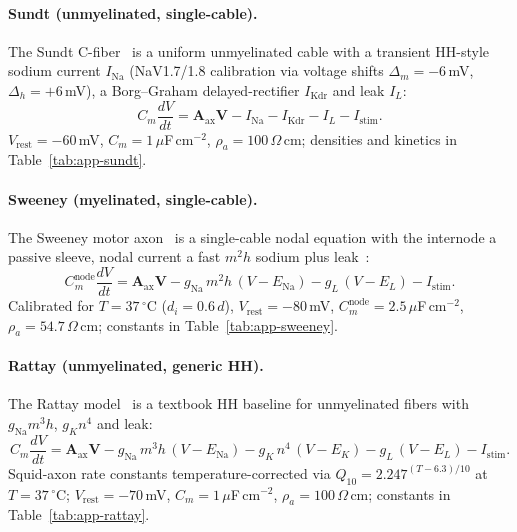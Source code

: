 \paragraph{Sundt (unmyelinated, single-cable).}
The Sundt C-fiber~\cite{sundt2015} is a uniform unmyelinated cable with
a transient HH-style sodium current $I_{\mathrm{Na}}$ (NaV1.7/1.8
calibration via voltage shifts $\Delta_m = -6$\,mV, $\Delta_h = +6$\,mV),
a Borg--Graham delayed-rectifier $I_{\mathrm{Kdr}}$ and leak $I_L$:
\begin{equation}
  C_m \frac{dV}{dt} = \mathbf{A}_{\mathrm{ax}}\mathbf{V} - I_{\mathrm{Na}}
  - I_{\mathrm{Kdr}} - I_L - I_{\mathrm{stim}}.
  \label{eq:cable-sundt}
\end{equation}
$V_{\mathrm{rest}} = -60$\,mV, $C_m = 1\,\mu$F\,cm$^{-2}$,
$\rho_a = 100\,\Omega\,$cm; densities and kinetics in
Table~\ref{tab:app-sundt}.

\paragraph{Sweeney (myelinated, single-cable).}
The Sweeney motor axon~\cite{sweeney1987} is a single-cable nodal
equation with the internode a passive sleeve, nodal current a fast
$m^2 h$ sodium plus leak~\cite{musselman2023}:
\begin{equation}
  C_m^{\mathrm{node}} \frac{dV}{dt} = \mathbf{A}_{\mathrm{ax}}\mathbf{V}
  - g_{\mathrm{Na}}\, m^2 h\, (V - E_{\mathrm{Na}}) - g_L\,(V - E_L)
  - I_{\mathrm{stim}}.
  \label{eq:cable-sweeney}
\end{equation}
Calibrated for $T = 37\,^\circ$C ($d_i = 0.6\,d$),
$V_{\mathrm{rest}} = -80$\,mV,
$C_m^{\mathrm{node}} = 2.5\,\mu$F\,cm$^{-2}$,
$\rho_a = 54.7\,\Omega\,$cm; constants in Table~\ref{tab:app-sweeney}.

\paragraph{Rattay (unmyelinated, generic HH).}
The Rattay model~\cite{rattay1989analysis} is a textbook HH baseline
for unmyelinated fibers with $g_{\mathrm{Na}} m^3 h$,
$g_K n^4$ and leak:
\begin{equation}
  C_m \frac{dV}{dt} = \mathbf{A}_{\mathrm{ax}}\mathbf{V}
  - g_{\mathrm{Na}}\, m^3 h\, (V - E_{\mathrm{Na}})
  - g_K\, n^4\, (V - E_K) - g_L\,(V - E_L) - I_{\mathrm{stim}}.
  \label{eq:cable-rattay}
\end{equation}
Squid-axon rate constants temperature-corrected via
$Q_{10} = 2.247^{(T - 6.3)/10}$ at $T = 37\,^\circ$C;
$V_{\mathrm{rest}} = -70$\,mV, $C_m = 1\,\mu$F\,cm$^{-2}$,
$\rho_a = 100\,\Omega\,$cm; constants in Table~\ref{tab:app-rattay}.

